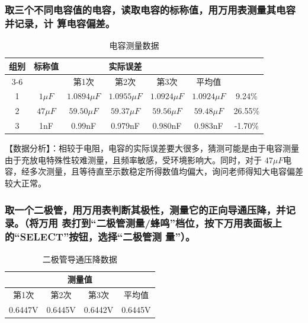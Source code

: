 \documentclass[10.5pt]{config}
\begin{document}
\subsubsection{取三个不同电容值的电容，读取电容的标称值，用万用表测量其电容并记录，计
算电容偏差。}

\begin{table}[H]
  \centering
  \caption{电容测量数据}
    \begin{tabular}{|c|c|>{\centering\arraybackslash}c|c|c|c|c|}
    \hline
    \multirow{2}[4]{*}{组别} & \multirow{2}[4]{*}{标称值} & \multicolumn{4}{c|}{测量值} & \multirow{2}[4]{*}{实际误差} \bigstrut\\
\cline{3-6}          &       & 第1次   & 第2次   & 第3次   & 平均值   &  \bigstrut\\
  \hline
  1     & $1\mu F$   & $1.0894\mu F$ & $1.0955\mu F$ & $1.0924\mu F$ & $1.0924\mu F$ & 9.24\% \bigstrut\\
  \hline
  2     & $47\mu F$  & $59.50\mu F$ & $59.37\mu F$ & $59.56\mu F$ & $59.48\mu F$ & 26.55\% \bigstrut\\
  \hline
  3     & 1nF   & 0.99nF & 0.979nF & 0.980nF & 0.983nF & -1.70\% \bigstrut\\
  \hline
    \end{tabular}%
  \label{tab:addlabel}%
\end{table}%

【数据分析】：相较于电阻，电容的实际误差要大很多，猜测可能是由于电容测量由于充放电特殊性较难测量，且频率敏感，受环境影响大。同时，对于 $47\mu F$电容，经多次测量，且等待直至示数稳定所得数值均偏大，询问老师得知大电容偏差较大正常。


\subsubsection{取一个二极管，用万用表判断其极性，测量它的正向导通压降，并记录。（将万用
表打到“二极管测量/蜂鸣”档位，按下万用表面板上的“SELECT”按钮，选择“二极管测
量”）。}

\begin{table}[H]
  \centering
  \caption{二极管导通压降数据}
    \begin{tabular}{|c|c|c|c|}
    \hline
    \multicolumn{4}{|c|}{测量值} \bigstrut\\
    \hline
    第1次   & 第2次   & 第3次   & 平均值 \bigstrut\\
    \hline
    0.6447V & 0.6445V & 0.6442V & 0.6445V \bigstrut\\
    \hline
    \end{tabular}%
  \label{tab:addlabel}%
\end{table}%
\end{document}
